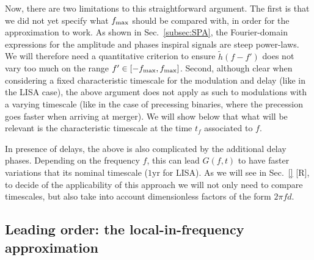 \documentclass[aps,showpacs,twocolumn,
prd,superscriptaddress,nofootinbib]{revtex4-1}
\newcommand{\SM}[1]{{\color{Red} #1}}
\begin{document}
Now, there are two limitations to this straightforward argument. The first is that we did not yet specify what $f_{\rm max}$ should be compared with, in order for the approximation to work. As shown in Sec.~\ref{subsec:SPA}, the Fourier-domain expressions for the amplitude and phases inspiral signals are steep power-laws. We will therefore need a quantitative criterion to ensure $\tilde{h}(f-f')$ does not vary too much on the range $f'\in [-f_{\rm max}, f_{\rm max}]$. Second, although clear when considering a fixed characteristic timescale for the modulation and delay (like in the LISA case), the above argument does not apply as such to modulations with a varying timescale (like in the case of precessing binaries, where the precession goes faster when arriving at merger). We will show below that what will be relevant is the characteristic timescale at the time $t_{f}$ associated to $f$. 

In presence of delays, the above is also complicated by the additional delay phases. Depending on the frequency $f$, this can lead $G(f,t)$ to have faster variations that its nominal timescale ($1\mathrm{yr}$ for LISA). As we will see in Sec.~\ref{} \SM{[R]}, to decide of the applicability of this approach we will not only need to compare timescales, but also take into account dimensionless factors of the form $2\pi f d$.


\subsection{Leading order: the local-in-frequency approximation}
\label{subsec:LLP}
\end{document}
